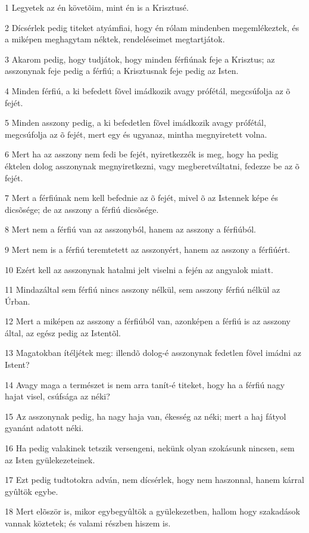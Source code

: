\par 1 Legyetek az én követõim, mint én is a Krisztusé.
\par 2 Dícsérlek pedig titeket atyámfiai, hogy én rólam mindenben megemlékeztek, és a miképen meghagytam néktek, rendeléseimet megtartjátok.
\par 3 Akarom pedig, hogy tudjátok, hogy minden férfiúnak feje a Krisztus; az asszonynak feje pedig a férfiú; a Krisztusnak feje pedig az  Isten.
\par 4 Minden férfiú, a ki befedett fõvel imádkozik avagy prófétál, megcsúfolja az õ fejét.
\par 5 Minden asszony pedig, a ki befedetlen fõvel imádkozik avagy prófétál, megcsúfolja az õ fejét, mert egy és ugyanaz, mintha megnyiretett volna.
\par 6 Mert ha az asszony nem fedi be fejét, nyiretkezzék is meg, hogy ha pedig éktelen dolog asszonynak megnyiretkezni, vagy megberetváltatni, fedezze be az õ fejét.
\par 7 Mert a férfiúnak nem kell befednie az õ fejét, mivel õ az Istennek képe és dicsõsége; de az asszony a férfiú dicsõsége.
\par 8 Mert nem a férfiú van az asszonyból, hanem az asszony a férfiúból.
\par 9 Mert nem is a férfiú teremtetett az asszonyért, hanem az asszony a férfiúért.
\par 10 Ezért kell az asszonynak hatalmi jelt viselni a fején az angyalok miatt.
\par 11 Mindazáltal sem férfiú nincs asszony nélkül, sem asszony férfiú nélkül az Úrban.
\par 12 Mert a miképen az asszony a férfiúból van, azonképen a férfiú is az asszony által, az egész pedig az Istentõl.
\par 13 Magatokban ítéljétek meg: illendõ dolog-é asszonynak fedetlen fõvel imádni az Istent?
\par 14 Avagy maga a természet is nem arra tanít-é titeket, hogy ha a férfiú nagy hajat visel, csúfsága az néki?
\par 15 Az asszonynak pedig, ha nagy haja van, ékesség az néki; mert a haj fátyol gyanánt adatott néki.
\par 16 Ha pedig valakinek tetszik versengeni, nekünk olyan szokásunk nincsen, sem az Isten gyülekezeteinek.
\par 17 Ezt pedig tudtotokra adván, nem dícsérlek, hogy nem haszonnal, hanem kárral gyûltök egybe.
\par 18 Mert elõször is, mikor egybegyûltök a gyülekezetben, hallom hogy szakadások vannak köztetek; és valami részben hiszem is.
